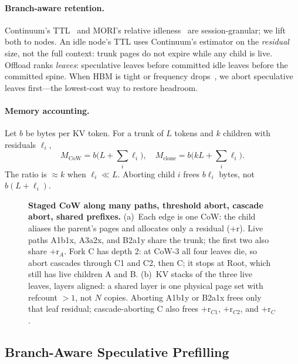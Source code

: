 \paragraph{Branch-aware retention.}
Continuum's TTL~\cite{continuum} and MORI's relative idleness~\cite{mori} are session-granular; we lift both to nodes.
An idle node's TTL uses Continuum's estimator on the \emph{residual} size, not the full context: trunk pages do not expire while any child is live.
Offload ranks \emph{leaves}: speculative leaves before committed idle leaves before the committed spine.
When HBM is tight or frequency drops~\cite{kairospower}, we abort speculative leaves first---the lowest-cost way to restore headroom.

\paragraph{Memory accounting.}
Let $b$ be bytes per KV token. For a trunk of $L$ tokens and $k$ children with residuals $\ell_i$,
\begin{equation}
\label{eq:mem}
M_{\mathrm{CoW}} = b\bigl(L + \textstyle\sum_i \ell_i\bigr),
\quad
M_{\mathrm{clone}} = b\bigl(kL + \textstyle\sum_i \ell_i\bigr).
\end{equation}
The ratio is $\approx k$ when $\ell_i \ll L$. Aborting child $i$ frees $b\ell_i$ bytes, not $b(L+\ell_i)$.

\begin{figure}[t]
\centering
\resizebox{\textwidth}{!}{}
\caption{\textbf{Staged CoW along many paths, threshold abort, cascade abort, shared prefixes.}
(a)~Each edge is one CoW: the child aliases the parent's pages and allocates only a residual ($+$r).
Live paths A1b1x, A3a2x, and B2a1y share the trunk; the first two also share $+$r$_A$.
Fork C has depth 2: at CoW-3 all four leaves die, so abort cascades through C1 and C2, then C; it stops at Root, which still has live children A and B.
(b)~KV stacks of the three live leaves, layers aligned: a shared layer is one physical page set with refcount ${>}1$, not $N$ copies.
Aborting A1b1y or B2a1x frees only that leaf residual; cascade-aborting C also frees $+$r$_{C1}$, $+$r$_{C2}$, and $+$r$_C$.
}
\label{fig:tree}
\end{figure}

\subsection{Branch-Aware Speculative Prefilling}
\label{sec:speculate}

